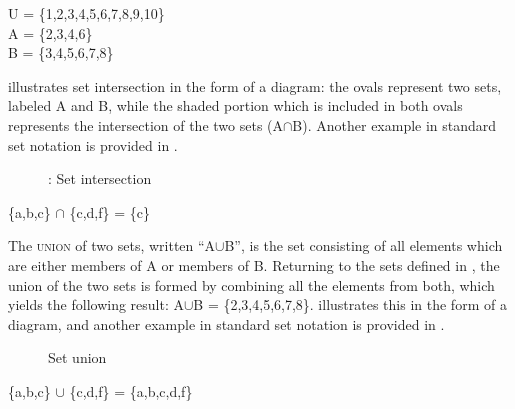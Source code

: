\ea \label{ex:13.14}
U = \{1,2,3,4,5,6,7,8,9,10\}\\
A = \{2,3,4,6\}\\
B = \{3,4,5,6,7,8\}
\z


 illustrates set intersection in the form of a diagram: the ovals represent two sets, labeled A and B, while the shaded portion which is included in both ovals represents the intersection of the two sets (A${\cap}$B). Another example in standard set notation is provided in .

\begin{figure}
 


\caption{\label{fig:key:2}: Set intersection}
\end{figure}

\ea \label{ex:13.15}
\{a,b,c\} ${\cap}$ \{c,d,f\} = \{c\}
\z


The \textsc{union} of two sets, written “A${\cup}$B”, is the set consisting of all elements which are either members of A or members of B. Returning to the sets defined in , the union of the two sets is formed by combining all the elements from both, which yields the following result: A${\cup}$B = \{2,3,4,5,6,7,8\}.  illustrates this in the form of a diagram, and another example in standard set notation is provided in .


\begin{figure}

\caption{\label{fig:key:3}Set union}
\end{figure}

\begin{stylepoints} \label{ex:13.16}
\{a,b,c\} ${\cup}$ \{c,d,f\} = \{a,b,c,d,f\}
\end{stylepoints}


